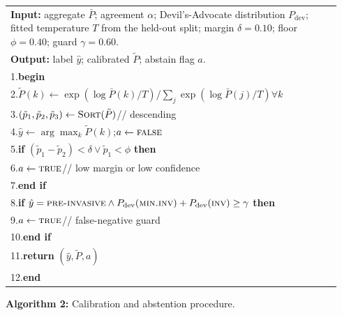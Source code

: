 \documentclass[12pt]{article}
\begin{document}
\begin{center}
\small
\renewcommand{\arraystretch}{1.35}
\begin{tabular}{|p{0.94\linewidth}|}
\hline
\textbf{Input:} aggregate $\bar P$; agreement $\alpha$; Devil's-Advocate distribution $P_{\mathrm{dev}}$; fitted temperature $T$ from the held-out split; margin $\delta=0.10$; floor $\phi=0.40$; guard $\gamma=0.60$. \\
\textbf{Output:} label $\hat y$; calibrated $\tilde P$; abstain flag $a$. \\
1.\quad \textbf{begin} \\
2.\quad \hspace*{1.5em}$\tilde P(k) \gets \exp(\log \bar P(k)/T) / \sum_j \exp(\log \bar P(j)/T)$\quad $\forall k$ \\
3.\quad \hspace*{1.5em}$(\tilde p_1, \tilde p_2, \tilde p_3) \gets \textsc{Sort}(\tilde P)$\quad // descending \\
4.\quad \hspace*{1.5em}$\hat y \gets \arg\max_k \tilde P(k)$;\quad $a \gets \textsc{false}$ \\
5.\quad \hspace*{1.5em}\textbf{if} $(\tilde p_1 - \tilde p_2) < \delta \vee \tilde p_1 < \phi$ \textbf{then} \\
6.\quad \hspace*{3em}$a \gets \textsc{true}$\quad // low margin or low confidence \\
7.\quad \hspace*{1.5em}\textbf{end if} \\
8.\quad \hspace*{1.5em}\textbf{if} $\hat y = \textsc{pre-invasive} \wedge P_{\mathrm{dev}}(\textsc{min.inv}) + P_{\mathrm{dev}}(\textsc{inv}) \ge \gamma$ \textbf{then} \\
9.\quad \hspace*{3em}$a \gets \textsc{true}$\quad // false-negative guard \\
10.\quad \hspace*{1.5em}\textbf{end if} \\
11.\quad \hspace*{1.5em}\textbf{return} $(\hat y, \tilde P, a)$ \\
12.\quad \textbf{end} \\
\hline
\end{tabular}
\end{center}
\vspace{-2pt}
\begin{center}
\small\textbf{Algorithm 2:} Calibration and abstention procedure.
\end{center}
\vspace{4pt}
\end{document}
